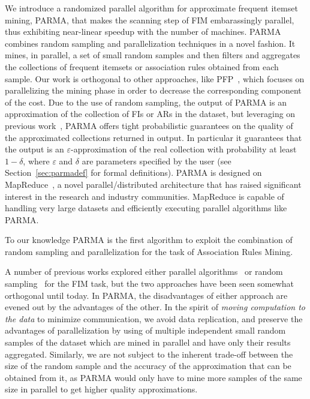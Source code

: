 We introduce a randomized parallel algorithm for approximate frequent itemset
mining, PARMA, that makes the scanning step of FIM embarassingly parallel, thus
exhibiting near-linear speedup with the number of machines. PARMA combines
random sampling and parallelization techniques in a novel fashion.  It mines, in
parallel, a set of small random samples and then filters and aggregates the
collections of frequent itemsets or association rules obtained from each sample.
Our work is orthogonal to other approaches, like PFP~\citep{LiWZZC08}, which
focuses on parallelizing the mining phase in order to decrease the corresponding
component of the cost. Due to the use of random sampling, the output of PARMA is
an approximation of
the collection of FIs or ARs in the dataset, but leveraging on previous
work~\citep{RiondatoU12}, PARMA offers tight probabilistic guarantees on the
quality of the approximated collections returned in output. In particular it
guarantees that the output is an $\varepsilon$-approximation of the real
collection with probability at least $1-\delta$, where $\varepsilon$ and
$\delta$ are parameters specified by the user (see Section~\ref{sec:parmadef} for
formal definitions). 
PARMA is designed on
MapReduce~\citep{DeanG08}, a novel parallel/distributed architecture that has
raised significant interest in the research and industry communities. MapReduce
is capable of handling very large datasets and efficiently executing parallel
algorithms like PARMA.

To our knowledge PARMA is the first algorithm to exploit the combination of
random sampling and parallelization for the task of Association Rules Mining. 

A number of previous works explored either parallel
algorithms~\citep{BuehrerPTKS07,CongHHP05,EHZaiane06,FangEtAl08,LiuLZT07,OzkuralUA11,JinYA05,Zaki99}
or random
sampling~\citep{Toivonen96,ZakiPLO97,Parthasarathy02,PietracaprinaRUV10,LiG04,RiondatoU12}
for the FIM task, but the two approaches have been seen somewhat orthogonal
until today. In PARMA, the disadvantages of either approach are evened out by
the advantages of the other. In the spirit of \emph{moving computation to the
data} to minimize communication, we avoid data replication, and preserve the
advantages of parallelization by using of multiple independent small random
samples of the dataset which are mined in parallel and have only their results
aggregated. Similarly, we are not subject to the inherent trade-off between the
size of the random sample and the accuracy of the approximation that can be
obtained from it, as PARMA would only have to mine more samples of the same size
in parallel to get higher quality approximations.

